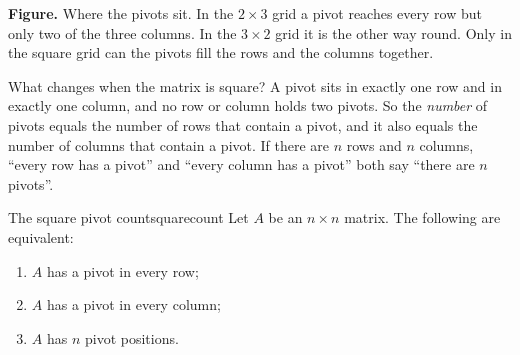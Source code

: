 \documentclass[11pt]{article}
\begin{document}
\begin{center}
\end{center}

\textbf{Figure.} Where the pivots sit. In the $2\times3$ grid a pivot reaches every row but only two of the three columns. In the $3\times2$ grid it is the other way round. Only in the square grid can the pivots fill the rows and the columns together.

What changes when the matrix is square? A pivot sits in exactly one row and in exactly one column, and no row or column holds two pivots. So the \emph{number} of pivots equals the number of rows that contain a pivot, and it also equals the number of columns that contain a pivot. If there are $n$ rows and $n$ columns, ``every row has a pivot'' and ``every column has a pivot'' both say ``there are $n$ pivots''.

\begin{thm}{The square pivot count}{squarecount}
Let $A$ be an $n\times n$ matrix. The following are equivalent:
\begin{enumerate}[label=(\alph*),itemsep=1pt]
  \item $A$ has a pivot in every row;
  \item $A$ has a pivot in every column;
  \item $A$ has $n$ pivot positions.
\end{enumerate}
\end{thm}
\end{document}
